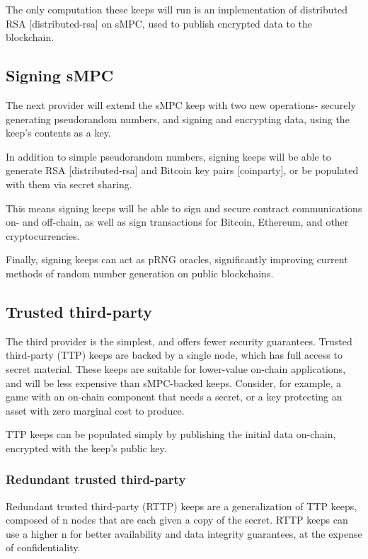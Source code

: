 \documentclass[11pt]{article}
\begin{document}
The only computation these keeps will run is an implementation of
distributed RSA [distributed-rsa] on sMPC, used to publish encrypted
data to the blockchain.


\subsection{Signing sMPC}

The next provider will extend the sMPC keep with two new operations-
securely generating pseudorandom numbers, and signing and encrypting
data, using the keep’s contents as a key.

In addition to simple pseudorandom numbers, signing keeps will be able
to generate RSA [distributed-rsa] and Bitcoin key pairs [coinparty],
or be populated with them via secret sharing.

This means signing keeps will be able to sign and secure contract
communications on- and off-chain, as well as sign transactions for
Bitcoin, Ethereum, and other cryptocurrencies.

Finally, signing keeps can act as pRNG oracles, significantly
improving current methods of random number generation on public
blockchains.


\subsection{Trusted third-party}

The third provider is the simplest, and offers fewer security
guarantees. Trusted third-party (TTP) keeps are backed by a single
node, which has full access to secret material. These keeps are
suitable for lower-value on-chain applications, and will be less
expensive than sMPC-backed keeps. Consider, for example, a game with
an on-chain component that needs a secret, or a key protecting an
asset with zero marginal cost to produce.

TTP keeps can be populated simply by publishing the initial data
on-chain, encrypted with the keep’s public key.


\subsubsection{Redundant trusted third-party}

Redundant trusted third-party (RTTP) keeps are a generalization of TTP
keeps, composed of n nodes that are each given a copy of the secret.
RTTP keeps can use a higher n for better availability and data
integrity guarantees, at the expense of confidentiality.
\end{document}

